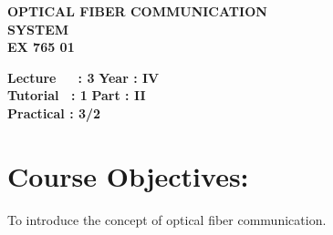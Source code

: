\begin{center}
    \textbf{\huge{\uppercase{Optical Fiber Communication \\ \vspace{0.5cm} system }}}
    \\
    \vspace{.5cm}
    \textbf{\large{EX 765 01}}
\end{center}

\noindent\textbf{Lecture\ \ \ : 3} \hfill \textbf{Year : IV} \\
\textbf{Tutorial \ : 1} \hfill \textbf{Part : II } \\
\textbf{Practical : 3/2}  \\

\par
\noindent 
\section*{Course Objectives:}
To introduce the concept of optical fiber communication.

